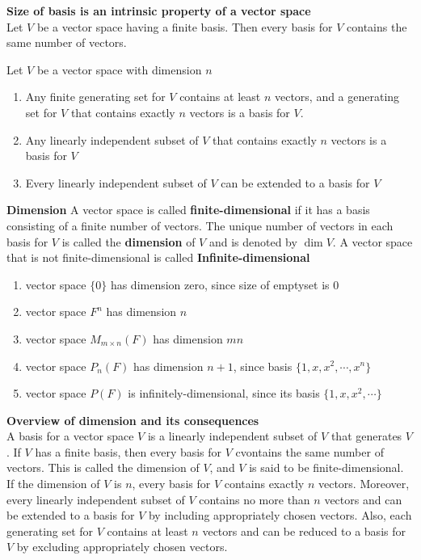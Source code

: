 \documentclass[11pt]{article}
\begin{document}
\begin{corollary*}
    \textbf{Size of basis is an intrinsic property of a vector space} \\ 
    Let $V$ be a vector space having a finite basis. Then every basis for $V$ contains the same number of vectors. 
\end{corollary*}

\begin{corollary*}
    Let $V$ be a vector space with dimension $n$
    \begin{enumerate}
        \item Any finite generating set for $V$ contains at least $n$ vectors, and a generating set for $V$ that contains exactly $n$ vectors is a basis for $V$. 
        \item Any linearly independent subset of $V$ that contains exactly $n$ vectors is a basis for $V$
        \item Every linearly independent subset of $V$ can be extended to a basis for $V$
    \end{enumerate}
\end{corollary*}

\begin{defn*}
    \textbf{Dimension} A vector space is called \textbf{finite-dimensional} if it has a basis consisting of a finite number of vectors. The unique number of vectors in each basis for $V$ is called the \textbf{dimension} of $V$ and is denoted by $\dim{V}$. A vector space that is not finite-dimensional is called \textbf{Infinite-dimensional}
    \begin{enumerate}
        \item vector space $\{0\}$ has dimension zero, since size of emptyset is 0
        \item vector space $F^n$ has dimension $n$
        \item vector space $M_{m\times n}(F)$ has dimension $mn$ 
        \item vector space $P_n(F)$ has dimension $n+1$, since basis $\{1, x, x^2, \cdots, x^n\}$
        \item vector space $P(F)$ is infinitely-dimensional, since its basis $\{1, x, x^2, \cdots \}$
    \end{enumerate}
\end{defn*}

\begin{defn*}
    \textbf{Overview of dimension and its consequences} \\
    A basis for a vector space $V$ is a linearly independent subset of $V$ that generates $V$. If $V$ has a finite basis, then every basis for $V$ cvontains the same number of vectors. This is called the dimension of $V$, and $V$ is said to be finite-dimensional. If the dimension of $V$ is $n$, every basis for $V$ contains exactly $n$ vectors. Moreover, every linearly independent subset of $V$ contains no more than $n$ vectors and can be extended to a basis for $V$ by including appropriately chosen vectors. Also, each generating set for $V$ contains at least $n$ vectors and can be reduced to a basis for $V$ by excluding appropriately chosen vectors. 
\end{defn*}
\end{document}
